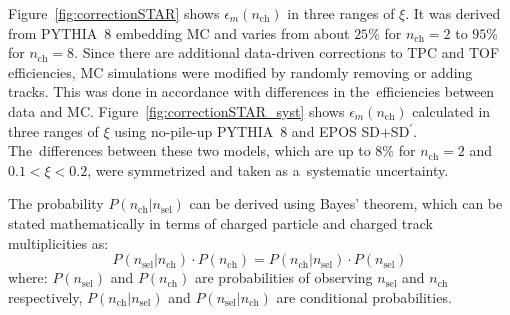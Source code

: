 Figure~\ref{fig:correctionSTAR} shows $\epsilon_{m}(n_\textrm{ch})$  in three ranges of $\xi$. It was derived from PYTHIA~8 embedding MC and varies from about $25\%$ for $n_\textrm{ch}=2$ to $95\%$ for $n_\textrm{ch}=8$. Since there are additional data-driven corrections to \ac{TPC} and TOF efficiencies,  MC simulations were modified by randomly removing or adding tracks. This was done in accordance with differences in the~efficiencies between data and MC. 
Figure~\ref{fig:correctionSTAR_syst} shows  $\epsilon_{m}(n_\textrm{ch})$ calculated in three ranges of $\xi$ using no-pile-up PYTHIA~8 and EPOS SD+SD$^\prime$. The~differences between
these two models, which are up to $8\%$ for $n_\textrm{ch}=2$ and $0.1<\xi<0.2$, were symmetrized and taken as a~systematic uncertainty.



\noindent The  probability $P(n_\textrm{ch}|n_\textrm{sel})$ can be derived using Bayes' theorem, which can be stated mathematically in terms of charged particle and charged track multiplicities as:
\begin{equation}
P\left(n_\textrm{sel}|n_\textrm{ch}\right)\cdot P\left(n_\textrm{ch}\right) = P\left(n_\textrm{ch}|n_\textrm{sel}\right)\cdot P\left(n_\textrm{sel}\right)
\end{equation}
where: $P(n_\textrm{sel})$ and $P(n_\textrm{ch})$ are probabilities of observing $n_\textrm{sel}$ and $n_\textrm{ch}$ respectively, $P(n_\textrm{ch}|n_\textrm{sel})$ and $P(n_\textrm{sel}|n_\textrm{ch})$ are conditional probabilities.

